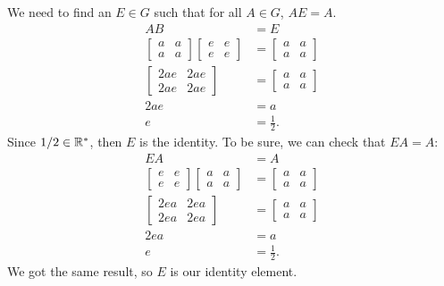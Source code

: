 \begin{enumerate}
\begin{itemize}
        We need to find an \(E\in G\) such that for all \(A\in G\), \(AE=A\).
        \begin{align*}
            AB &= E \\
            \begin{bmatrix}
                a & a \\ a & a
            \end{bmatrix}\begin{bmatrix}
                e & e \\ e & e
            \end{bmatrix} &= \begin{bmatrix}
                a & a \\ a & a
            \end{bmatrix} \\
            \begin{bmatrix}
                2ae & 2ae \\ 2ae & 2ae
            \end{bmatrix} &= \begin{bmatrix}
                a & a \\ a & a
            \end{bmatrix} \\
            2ae &= a \\
            e &= \frac{1}{2}.
        \end{align*}
        Since \(1/2 \in\mathbb{R}^*\), then \(E\) is the identity. To be sure, we can check that \(EA = A\):
        \begin{align*}
            EA &= A \\
            \begin{bmatrix}
                e & e \\ e & e
            \end{bmatrix}\begin{bmatrix}
                a & a \\ a & a
            \end{bmatrix} &= \begin{bmatrix}
                a & a \\ a & a
            \end{bmatrix} \\
            \begin{bmatrix}
                2ea & 2ea \\ 2ea & 2ea
            \end{bmatrix} &= \begin{bmatrix}
                a & a \\ a & a
            \end{bmatrix} \\
            2ea &= a \\
            e &= \frac{1}{2}.
        \end{align*}
        We got the same result, so \(E\) is our identity element.


\end{itemize}
\end{enumerate}
